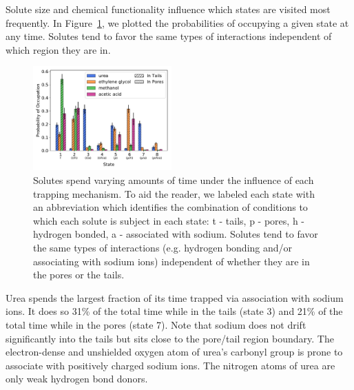 \documentclass{article}
\begin{document}
  Solute size and chemical functionality influence which states are visited most frequently.
  In Figure~\ref{fig:state_probabilities}, we plotted the probabilities of occupying
  a given state at any time. Solutes tend to favor the same types of interactions 
  independent of which region they are in.

  
  \begin{figure}
  \centering
  \includegraphics[width=0.475\textwidth]{state_probabilities.pdf}
  \caption{Solutes spend varying amounts of time under the influence of each
  trapping mechanism. To aid the reader, we labeled each state with an abbreviation which
  identifies the combination of conditions to which each solute is subject in each state:
  t - tails, p - pores, h - hydrogen bonded, a - associated with sodium. Solutes tend to 
  favor the same types of interactions (e.g. hydrogen bonding and/or associating with sodium
  ions) independent of whether they are in the pores or the tails.}\label{fig:state_probabilities}
  \end{figure}
  
  Urea spends the largest fraction of its time trapped via association with sodium ions.
  It does so 31\% of the total time while in the tails (state 3) and 21\% of the
  total time while in the pores (state 7). Note that sodium does not drift significantly 
  into the tails but sits close to the pore/tail region boundary. The electron-dense 
  and unshielded oxygen atom of urea's carbonyl group is prone to associate with 
  positively charged sodium ions. The nitrogen atoms of urea are only weak hydrogen bond
  donors.
  
\end{document}
